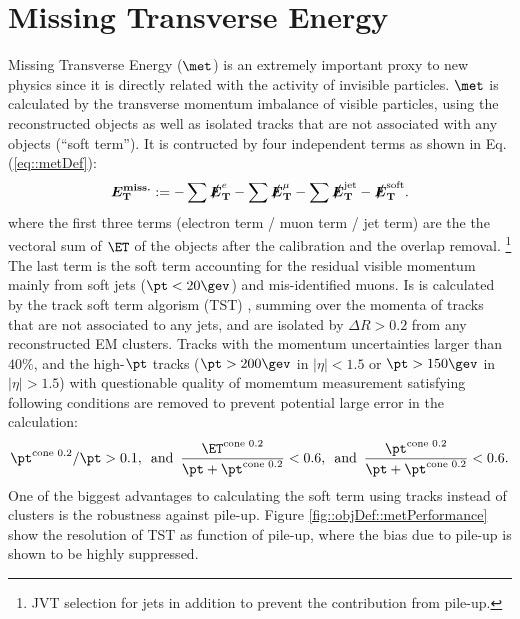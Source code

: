 \clearpage
\section{Missing Transverse Energy} \label{sec::objDef::met}
Missing Transverse Energy ($\met$) is an extremely important proxy to new physics 
since it is directly related with the activity of invisible particles. 
$\met$ is calculated by the transverse momentum imbalance of visible particles, using the reconstructed objects as well as isolated tracks that are not associated with any objects (``soft term'').
It is contructed by four independent terms as shown in Eq. (\ref{eq::metDef}):
\begin{align}
\bm{E_\mathrm{T}^{\mathrm{miss.}}} :=  - \sum \bm{\slashed{E}_{\mathrm{T}}}^{e} - \sum \bm{\slashed{E}_{\mathrm{T}}}^{\mu} - \sum \bm{\slashed{E}_{\mathrm{T}}}^{\mathrm{jet}} - \bm{\slashed{E}_{\mathrm{T}}}^{\mathrm{soft}}.
\label{eq::metDef}
\end{align}
where the first three terms (electron term / muon term / jet term) are the the vectoral sum of $\ET$ of the objects after the calibration and the overlap removal. 
\footnote{JVT selection for jets in addition to prevent the contribution from pile-up.}
%
%
The last term is the soft term accounting for the residual visible momentum mainly from soft jets ($\pt<20\gev$) and mis-identified muons.
Is is calculated by the track soft term algorism (TST) \cite{175_MET_Run2_exp}, 
summing over the momenta of tracks that are not associated to any jets, and are isolated by $\Delta R>0.2$ from any reconstructed EM clusters. 
Tracks with the momentum uncertainties larger than $40\%$, and the high-$\pt$ tracks ($\pt>200 \gev$ in $|\eta|<1.5$ or $\pt>150 \gev$ in $|\eta|>1.5$) with questionable quality of momemtum measurement satisfying following conditions are removed to prevent potential large error in the calculation:
\begin{align}
\ptcone/\pt>0.1, \,\,\, \mathrm{and} \,\,\, \frac{\etcone}{\pt+\ptcone}<0.6, \,\,\,  \mathrm{and} \,\,\, \frac{\ptcone}{\pt+\ptcone}<0.6.
\end{align}
One of the biggest advantages to calculating the soft term using tracks instead of clusters is the robustness against pile-up.
Figure \ref{fig::objDef::metPerformance} show the resolution of TST as function of pile-up,
where the bias due to pile-up is shown to be highly suppressed.

